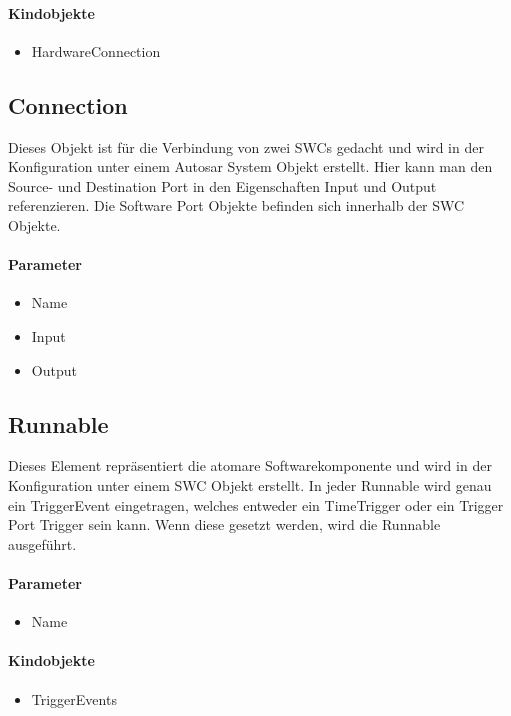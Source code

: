 \paragraph{Kindobjekte}
\begin{itemize}
\item HardwareConnection
\end{itemize}


\subsection{Connection}
Dieses Objekt ist für die Verbindung von zwei SWCs gedacht und wird in der Konfiguration unter einem \frqq{}Autosar System\flqq{} Objekt erstellt. Hier kann man den Source- und Destination Port in den Eigenschaften Input und Output referenzieren. Die Software Port Objekte befinden sich innerhalb der \frqq{}SWC\flqq{} Objekte.
\paragraph{Parameter}
\begin{itemize}
\item Name
\item Input
\item Output
\end{itemize}


\subsection{Runnable}
Dieses Element repräsentiert die atomare Softwarekomponente und wird in der Konfiguration unter einem \frqq{}SWC\flqq{} Objekt erstellt. In jeder Runnable wird genau ein TriggerEvent eingetragen, welches entweder ein \frqq{}TimeTrigger\flqq{} oder ein \frqq{}Trigger Port Trigger\flqq{} sein kann. Wenn diese gesetzt werden, wird die Runnable ausgeführt.
\paragraph{Parameter}
\begin{itemize}
\item Name
\end{itemize}
\paragraph{Kindobjekte}
\begin{itemize}
\item TriggerEvents
\end{itemize}

